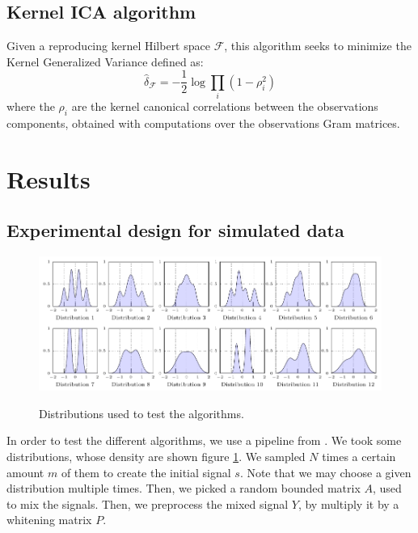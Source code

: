 \documentclass[a4paper]{article}
\begin{document}
\subsection{Kernel ICA algorithm}
Given a reproducing kernel Hilbert space $\mathcal{F}$, this algorithm seeks to minimize the Kernel Generalized Variance defined as:
\begin{equation}
	\widehat{\delta}_{\mathcal{F}}=-\frac{1}{2}\log \underset{i}{\prod}(1-\rho_i^2)
\end{equation}
where the $\rho_i$ are the kernel canonical correlations between the observations components, obtained with computations over the observations Gram matrices.


\section{Results}

\subsection{Experimental design for simulated data}

\begin{figure}
\centering
\includegraphics[scale=0.9]{figure_tikz/graph_distrib.pdf}\\
\caption{Distributions used to test the algorithms.\label{fig:distrib}}
\end{figure}

In order to test the different algorithms, we use a pipeline from \cite{bach2003kernel}.
We took some distributions, whose density are shown figure \ref{fig:distrib}.
We sampled $N$ times a certain amount $m$ of them to create the initial signal $s$. Note that we may choose a given distribution multiple times.
Then, we picked a random bounded matrix $A$, used to mix the signals.
Then, we preprocess the mixed signal $Y$, by multiply it by a whitening matrix $P$.
\end{document}
